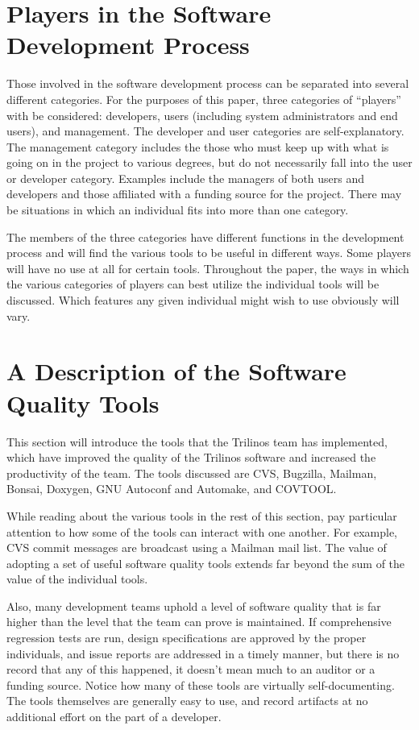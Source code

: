 \documentclass[12pt,relax]{article}
\begin{document}
\section{Players in the Software Development Process}
Those involved in the software development process can be separated into 
several different categories.  For the purposes of this paper, three 
categories of ``players'' with be considered: developers, users (including 
system administrators and end users), and management.  The developer and user 
categories are self-explanatory.  The management category includes the those 
who must keep up with what is going on in the project to various degrees, but 
do not necessarily fall into the user or developer category.  Examples include 
the managers of both users and developers and those affiliated with a funding 
source for the project.  There may be situations in which an individual fits 
into more than one category.

The members of the three categories have different functions in the 
development process and will find the various tools to be useful 
in different ways.  Some players will have no use at all for certain tools.
Throughout the paper, the ways in which the various categories of players 
can best utilize the individual tools will be discussed.  Which features any 
given individual might wish to use obviously will vary.

\section{A Description of the Software Quality Tools}
\label{Section:CommunicationTools}

This section will introduce the tools that the Trilinos team has implemented, 
which have improved the quality of the Trilinos software and increased the 
productivity of the team.  The tools discussed are CVS, Bugzilla, Mailman, 
Bonsai, Doxygen, GNU Autoconf and Automake, and COVTOOL.

While reading about the various tools in the rest of this section, pay 
particular attention to how some of the tools can interact with one another.
For example, CVS commit messages are broadcast using a Mailman mail list.
The value of adopting a set of useful software quality tools extends far 
beyond the sum of the value of the individual tools.

Also, many development teams uphold a level of software quality that is far 
higher than the level that the team can prove is maintained.  If comprehensive
regression tests are run, design specifications are approved by the 
proper individuals, and issue reports are addressed in a timely manner, but 
there is no record that any of this happened, it doesn't mean much to an 
auditor or a funding source.  Notice how many of these tools are virtually
self-documenting.  The tools themselves are generally easy to use, and 
record artifacts at no additional effort on the part of a developer.  
\end{document}
